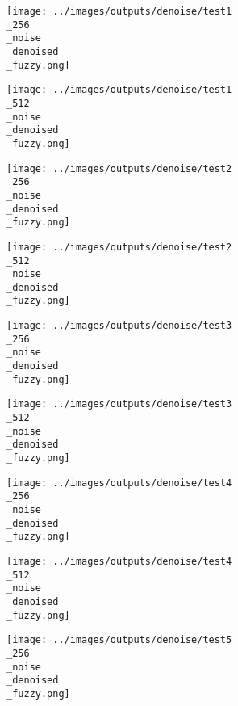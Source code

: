 \begin{figure}[!ht]
   \centering
\begin{subfigure}[t]{0.15\textwidth}
    \texttt{[image: ../images/outputs/denoise/test1\\\_256\\\_noise\\\_denoised\\\_fuzzy.png]}
    \caption{}
    \centering
  \end{subfigure}
\begin{subfigure}[t]{0.15\textwidth}
    \texttt{[image: ../images/outputs/denoise/test1\\\_512\\\_noise\\\_denoised\\\_fuzzy.png]}
    \caption{}
    \centering
  \end{subfigure}
\begin{subfigure}[t]{0.15\textwidth}
    \texttt{[image: ../images/outputs/denoise/test2\\\_256\\\_noise\\\_denoised\\\_fuzzy.png]}
    \caption{}
    \centering
  \end{subfigure}
\begin{subfigure}[t]{0.15\textwidth}
    \texttt{[image: ../images/outputs/denoise/test2\\\_512\\\_noise\\\_denoised\\\_fuzzy.png]}
    \caption{}
    \centering
  \end{subfigure}
\begin{subfigure}[t]{0.15\textwidth}
    \texttt{[image: ../images/outputs/denoise/test3\\\_256\\\_noise\\\_denoised\\\_fuzzy.png]}
    \caption{}
    \centering
  \end{subfigure}
\begin{subfigure}[t]{0.15\textwidth}
    \texttt{[image: ../images/outputs/denoise/test3\\\_512\\\_noise\\\_denoised\\\_fuzzy.png]}
    \caption{}
    \centering
  \end{subfigure}
\begin{subfigure}[t]{0.15\textwidth}
    \texttt{[image: ../images/outputs/denoise/test4\\\_256\\\_noise\\\_denoised\\\_fuzzy.png]}
    \caption{}
    \centering
  \end{subfigure}
\begin{subfigure}[t]{0.15\textwidth}
    \texttt{[image: ../images/outputs/denoise/test4\\\_512\\\_noise\\\_denoised\\\_fuzzy.png]}
    \caption{}
    \centering
  \end{subfigure}
\begin{subfigure}[t]{0.15\textwidth}
    \texttt{[image: ../images/outputs/denoise/test5\\\_256\\\_noise\\\_denoised\\\_fuzzy.png]}
    \caption{}
    \centering
  \end{subfigure}
\begin{subfigure}[t]{0.15\textwidth}

\end{subfigure}
\end{figure}
